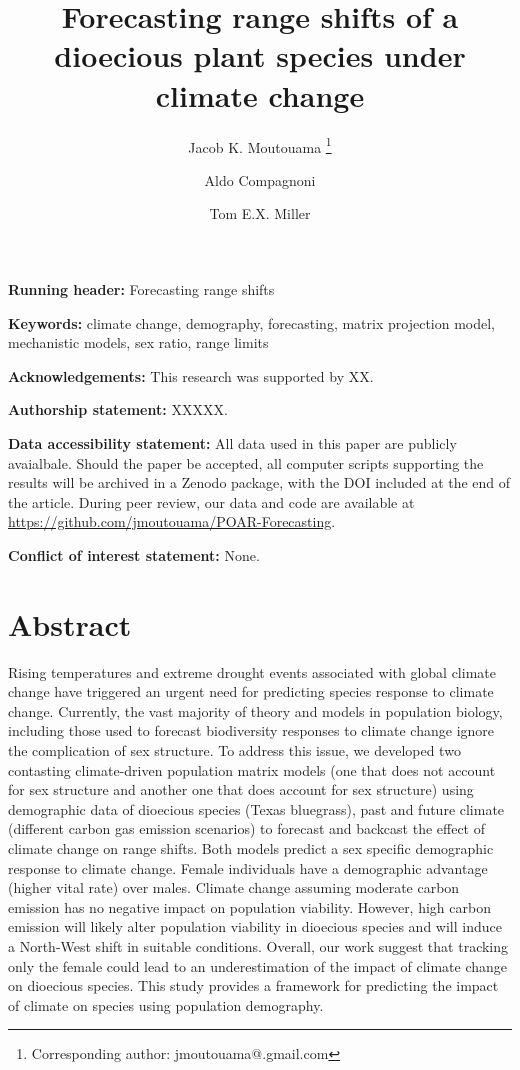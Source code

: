 \documentclass[12pt]{article}
\title{Forecasting range shifts of a dioecious plant species under climate change}
\author[1]{Jacob K. Moutouama \thanks{Corresponding author: jmoutouama@.gmail.com}}
\author[2]{Aldo Compagnoni}
\author[1]{Tom E.X. Miller}
\affil[1]{Program in Ecology and Evolutionary Biology, Department of BioSciences, Rice University, Houston, TX USA}
\affil[2]{Institute of Biology, Martin Luther University Halle-Wittenberg, Halle, Germany; and German Centre for Integrative Biodiversity Research (iDiv), Leipzig, Germany}
\date{} %
\begin{document}
\renewcommand{\baselinestretch}{1.2}
\maketitle

\bigskip 
\noindent\textbf{Running header:} Forecasting range shifts

\bigskip 
\noindent\textbf{Keywords:} climate change, demography, forecasting, matrix projection model, mechanistic models, sex ratio, range limits

\bigskip 
\noindent\textbf{Acknowledgements:} This research was supported by  XX.

\bigskip
\noindent\textbf{Authorship statement:} XXXXX.  

\bigskip 
\noindent\textbf{Data accessibility statement:} All data \citep{dryaddata} used in this paper are  publicly avaialbale. Should the paper be accepted, all computer scripts supporting the results will be archived in a Zenodo package, with the DOI included at the end of the article. During peer review, our data and code are available at \url{https://github.com/jmoutouama/POAR-Forecasting}. 

\bigskip 
\noindent\textbf{Conflict of interest statement:} None.
\newpage
\linenumbers
\section*{Abstract}
Rising temperatures and extreme drought events associated with global climate change have triggered an urgent need for predicting species response to climate change.
Currently, the vast majority of theory and models in population biology, including those used to forecast biodiversity responses to climate change ignore the complication of sex structure. 
To address this issue, we developed two contasting climate-driven population matrix models (one that does not account for sex structure and another one that does account for sex structure) using
demographic data of dioecious species (Texas bluegrass), past and future climate (different carbon gas emission scenarios) to forecast and backcast the effect of climate change on range shifts.
Both models predict a sex specific demographic response to climate change.
Female individuals have a demographic advantage (higher vital rate) over males.
Climate change assuming moderate carbon emission has no negative impact on population viability. 
However, high carbon emission will likely alter population viability in dioecious species and will induce a North-West shift in suitable conditions. 
Overall, our work suggest that tracking only the female could lead to an underestimation of the impact of climate change on dioecious species. 
This study provides a framework for predicting the impact of climate on species using population demography. 
\end{document}
